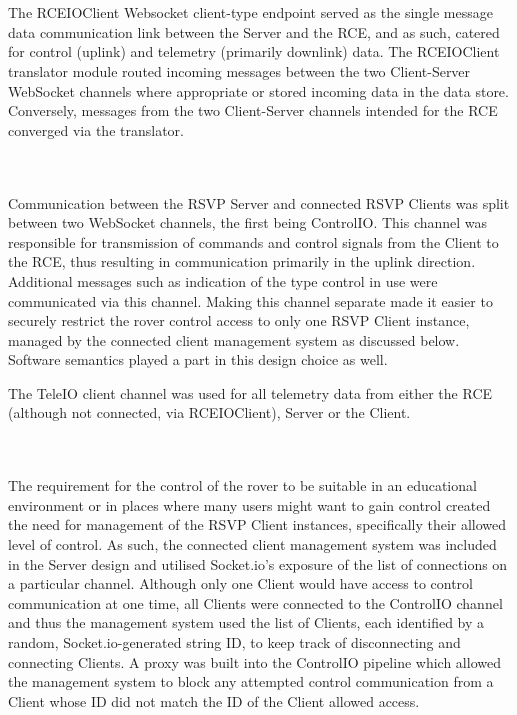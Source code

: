         \\\\      
          The RCEIOClient Websocket client-type endpoint served as the single message data communication link between the Server and the RCE, and as such, catered for control (uplink) and telemetry (primarily downlink) data. The RCEIOClient translator module routed incoming messages between the two Client-Server WebSocket channels where appropriate or stored incoming data in the data store. Conversely, messages from the two Client-Server channels intended for the RCE converged via the translator.

        \\\\
          Communication between the RSVP Server and connected RSVP Clients was split between two WebSocket channels, the first being ControlIO. This channel was responsible for transmission of commands and control signals from the Client to the RCE, thus resulting in communication primarily in the uplink direction. Additional messages such as indication of the type control in use were communicated via this channel. Making this channel separate made it easier to securely restrict the rover control access to only one RSVP Client instance, managed by the connected client management system as discussed below. Software semantics played a part in this design choice as well.
          
          The TeleIO client channel was used for all telemetry data from either the RCE (although not connected, via RCEIOClient), Server or the Client.

        \\\\         
          The requirement for the control of the rover to be suitable in an educational environment or in places where many users might want to gain control created the need for management of the RSVP Client instances, specifically their allowed level of control. As such, the connected client management system was included in the Server design and utilised Socket.io's exposure of the list of connections on a particular channel. Although only one Client would have access to control communication at one time, all Clients were connected to the ControlIO channel and thus the management system used the list of Clients, each identified by a random, Socket.io-generated string ID, to keep track of disconnecting and connecting Clients. A proxy was built into the ControlIO pipeline which allowed the management system to block any attempted control communication from a Client whose ID did not match the ID of the Client allowed access.
          
